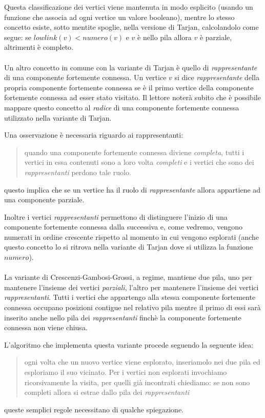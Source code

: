 Questa classificazione dei vertici viene mantenuta in modo esplicito
(usando un funzione che associa ad ogni vertice un valore booleano),
mentre lo stesso concetto esiste, sotto mentite spoglie, nella
versione di Tarjan, calcolandolo come segue: se $lowlink(v) <
numero(v)$ e $v$ \`e nello pila allora $v$ \`e parziale, altrimenti
\`e completo.
\\\\
Un altro concetto in comune con la variante di Tarjan \`e quello di
\emph{rappresentante} di una componente fortemente connessa. Un
vertice $v$ si dice \emph{rappresentante} della propria componente
fortemente connessa se \`e il primo vertice della componente
fortemente connessa ad esser stato visitato. Il lettore noter\`a
subito che \`e possibile mappare questo concetto al \emph{radice} di
una componente fortemente connessa utilizzato nella variante di
Tarjan.

Una osservazione \`e necessaria riguardo ai rappresentanti:
\begin{quotation}
  quando una componente fortemente connessa diviene \emph{completa},
  tutti i vertici in essa contenuti sono a loro volta \emph{completi}
  e i vertici che sono dei \emph{rappresentanti} perdono tale ruolo.
\end{quotation}
questo implica che se un vertice ha il ruolo di \emph{rappresentante}
allora appartiene ad una componente parziale. 

Inoltre i vertici \emph{rappresentanti} permettono di distinguere
l'inizio di una componente fortemente connessa dalla successiva e, come
vedremo, vengono numerati in ordine crescente rispetto al momento in
cui vengono esplorati (anche questo concetto lo si ritrova nella
variante di Tarjan dove si utilizza la funzione $numero$).
\\\\
La variante di Crescenzi-Gambosi-Grossi, a regime, mantiene due pila,
uno per mantenere l'insieme dei vertici \emph{parziali}, l'altro per
mantenere l'insieme dei vertici \emph{rappresentanti}. Tutti i vertici
che appartengo alla stessa componente fortemente connessa occupano
posizioni contigue nel relativo pila mentre il primo di essi sar\`a
inserito anche nello pila dei \emph{rappresentanti} finch\`e la
componente fortemente connessa non viene chiusa.

L'algoritmo che implementa questa variante procede seguendo la
seguente idea:
\begin{quotation}
  ogni volta che un nuovo vertice viene esplorato, inseriamolo nei due
  pila ed esploriamo il suo vicinato. Per i vertici non esplorati
  invochiamo ricorsivamente la visita, per quelli gi\`a incontrati
  chiediamo: se non sono completi allora si estrae dallo pila dei
  \emph{rappresentanti}
\end{quotation}
queste semplici regole necessitano di qualche
spiegazione. 

